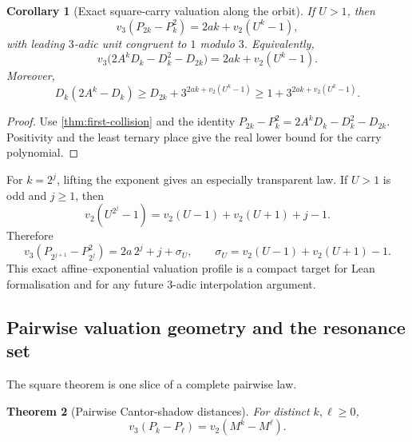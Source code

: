 \documentclass[11pt]{article}
\newtheorem{theorem}{Theorem}[section]
\newtheorem{corollary}[theorem]{Corollary}
\theoremstyle{definition}
\theoremstyle{remark}
\newcommand{\vTwo}{v_2}
\newcommand{\vThree}{v_3}
\begin{document}
\begin{corollary}[Exact square-carry valuation along the orbit]
\label{cor:orbit-square-carry}
If $U>1$, then
\begin{equation}\label{eq:orbit-square-carry}
 \boxed{
 \vThree(P_{2k}-P_k^2)
 =2ak+\vTwo(U^k-1),}
\end{equation}
with leading $3$-adic unit congruent to $1$ modulo $3$.  Equivalently,
\begin{equation}\label{eq:defect-square-valuation}
 \boxed{
 \vThree\bigl(2A^kD_k-D_k^2-D_{2k}\bigr)
 =2ak+\vTwo(U^k-1).}
\end{equation}
Moreover,
\begin{equation}\label{eq:explicit-carry-budget}
 D_k(2A^k-D_k)
 \ge D_{2k}+3^{2ak+\vTwo(U^k-1)}
 \ge1+3^{2ak+\vTwo(U^k-1)}.
\end{equation}
\end{corollary}

\begin{proof}
Use \cref{thm:first-collision} and the identity
$P_{2k}-P_k^2=2A^kD_k-D_k^2-D_{2k}$.  Positivity and the least ternary place
give the real lower bound for the carry polynomial.
\end{proof}

For $k=2^j$, lifting the exponent gives an especially transparent law.  If
$U>1$ is odd and $j\ge1$, then
\[
 \vTwo(U^{2^j}-1)
 =\vTwo(U-1)+\vTwo(U+1)+j-1.
\]
Therefore
\begin{equation}\label{eq:dyadic-tower-valuation}
 \vThree(P_{2^{j+1}}-P_{2^j}^2)
 =2a\,2^j+j+\sigma_U,
 \qquad
 \sigma_U=\vTwo(U-1)+\vTwo(U+1)-1.
\end{equation}
This exact affine--exponential valuation profile is a compact target for Lean
formalisation and for any future $3$-adic interpolation argument.

\subsection{Pairwise valuation geometry and the resonance set}

The square theorem is one slice of a complete pairwise law.

\begin{theorem}[Pairwise Cantor-shadow distances]\label{thm:pairwise-shadow}
For distinct $k,\ell\ge0$,
\begin{equation}\label{eq:pairwise-shadow}
 \boxed{
 \vThree(P_k-P_\ell)=\vTwo(M^k-M^\ell).}
\end{equation}
\end{theorem}
\end{document}
